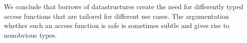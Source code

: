 We conclude that borrows of datastructures create the need for
differently typed access functions that are tailored for different use
cases. The argumentation whether such an access function is safe is
sometimes subtle and gives rise to nonobvious types.

\lstDeleteShortInline@

